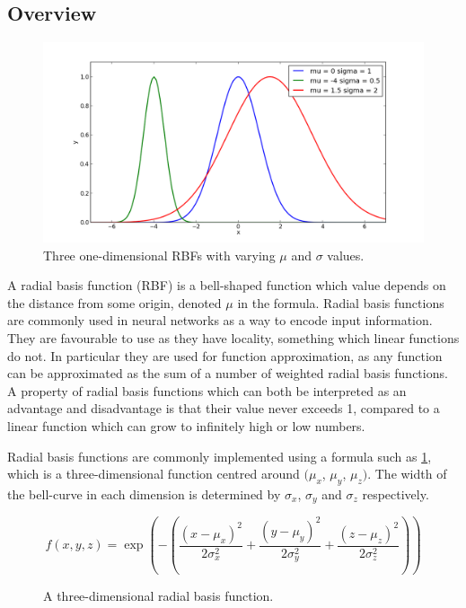 \documentclass[a4paper,11pt]{kth-mag}
\begin{document}
\subsection{Overview}

\begin{figure}
\centering\includegraphics[scale=0.5]{rbf_1d.png}
\caption{Three one-dimensional RBFs with varying $\mu$ and $\sigma$ values.}
\end{figure}

A radial basis function (RBF) is a bell-shaped function which value depends on the distance from some origin, denoted $\mu$ in the formula.  Radial basis functions are commonly used in neural networks as a way to encode input information. They are favourable to use as they have locality, something which linear functions do not. In particular they are used for function approximation, as any function can be approximated as the sum of a number of weighted radial basis functions. A property of radial basis functions which can both be interpreted as an advantage and disadvantage is that their value never exceeds 1, compared to a linear function which can grow to infinitely high or low numbers.

Radial basis functions are commonly implemented using a formula such as \ref{RBF_1}, which is a three-dimensional function centred around $(\mu _{x}$, $\mu _{y}$, $\mu _{z})$. The width of the bell-curve in each dimension is determined by $\sigma _{x}$, $\sigma _{y}$ and $\sigma _{z}$ respectively.

\begin{figure}
\begin{equation}
f(x,y,z) = \exp(-(\frac{(x-\mu_{x})^{2}}{2 \sigma _{x}^{2}} + \frac{(y-\mu_{y})^{2}}{2 \sigma _{y}^{2}} + \frac{(z-\mu_{z})^{2}}{2 \sigma _{z}^{2}}))
\end{equation}
\caption{A three-dimensional radial basis function.\label{RBF_1}}
\end{figure}
\end{document}
